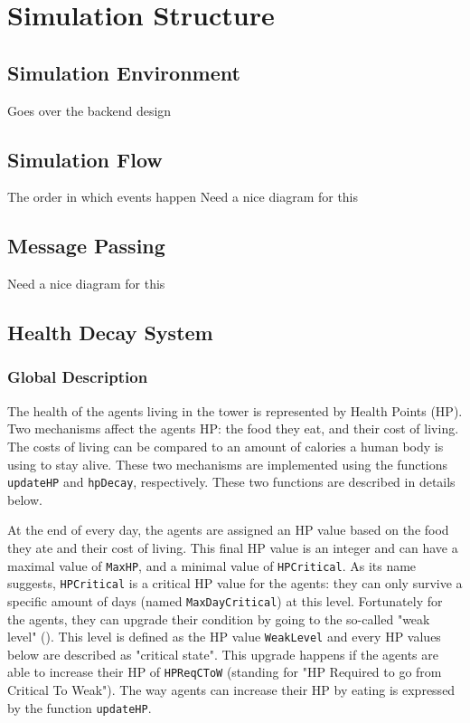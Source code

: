 \chapter{Simulation Structure}\label{simulation_structure}

\section{Simulation Environment}\label{simulation_environment}
Goes over the backend design

\section{Simulation Flow}\label{simulation_flow}
The order in which events happen
Need a nice diagram for this

\section{Message Passing}\label{message_passing}
Need a nice diagram for this

\section{Health Decay System}\label{health_system}


%
%
\subsection{Global Description}

The health of the agents living in the tower is represented by Health Points (HP). Two mechanisms affect the agents HP: the food they eat, and their cost of living. The costs of living can be compared to an amount of calories a human body is using to stay alive. These two mechanisms are implemented using the functions \texttt{updateHP} and \texttt{hpDecay}, respectively. These two functions are described in details below.

At the end of every day, the agents are assigned an HP value based on the food they ate and their cost of living. This final HP value is an integer and can have a maximal value of \texttt{MaxHP}, and a minimal value of \texttt{HPCritical}. As its name suggests, \texttt{HPCritical} is a critical HP value for the agents: they can only survive a specific amount of days (named \texttt{MaxDayCritical}) at this level. Fortunately for the agents, they can upgrade their condition by going to the so-called "weak level" (). This level is defined as the HP value \texttt{WeakLevel} and every HP values below are described as "critical state". This upgrade happens if the agents are able to increase their HP of \texttt{HPReqCToW} (standing for "HP Required to go from Critical To Weak"). The way agents can increase their HP by eating is expressed by the function \texttt{updateHP}.

